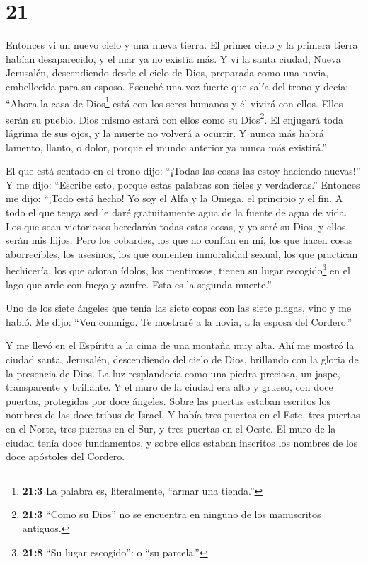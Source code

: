 \hypertarget{section-20}{%
\section{21}\label{section-20}}

 Entonces vi un nuevo cielo y una nueva tierra. El primer
cielo y la primera tierra habían desaparecido, y el mar ya no existía
más.  Y vi la santa ciudad, Nueva Jerusalén, descendiendo
desde el cielo de Dios, preparada como una novia, embellecida para su
esposo.  Escuché una voz fuerte que salía del trono y decía:
``Ahora la casa de Dios\footnote{\textbf{21:3} La palabra es,
  literalmente, ``armar una tienda.''} está con los seres humanos y él
vivirá con ellos. Ellos serán su pueblo. Dios mismo estará con ellos
como su Dios\footnote{\textbf{21:3} ``Como su Dios'' no se encuentra en
  ninguno de los manuscritos antiguos.}.  El enjugará toda
lágrima de sus ojos, y la muerte no volverá a ocurrir. Y nunca más habrá
lamento, llanto, o dolor, porque el mundo anterior ya nunca más
existirá.''

 El que está sentado en el trono dijo: ``¡Todas las cosas
las estoy haciendo nuevas!'' Y me dijo: ``Escribe esto, porque estas
palabras son fieles y verdaderas.''  Entonces me dijo:
``¡Todo está hecho! Yo soy el Alfa y la Omega, el principio y el fin. A
todo el que tenga sed le daré gratuitamente agua de la fuente de agua de
vida.  Los que sean victoriosos heredarán todas estas cosas,
y yo seré su Dios, y ellos serán mis hijos.  Pero los
cobardes, los que no confían en mí, los que hacen cosas aborrecibles,
los asesinos, los que comenten inmoralidad sexual, los que practican
hechicería, los que adoran ídolos, los mentirosos, tienen su lugar
escogido\footnote{\textbf{21:8} ``Su lugar escogido'': o ``su parcela.''}
en el lago que arde con fuego y azufre. Esta es la segunda muerte.''

 Uno de los siete ángeles que tenía las siete copas con las
siete plagas, vino y me habló. Me dijo: ``Ven conmigo. Te mostraré a la
novia, a la esposa del Cordero.''

 Y me llevó en el Espíritu a la cima de una montaña muy
alta. Ahí me mostró la ciudad santa, Jerusalén, descendiendo del cielo
de Dios,  brillando con la gloria de la presencia de Dios.
La luz resplandecía como una piedra preciosa, un jaspe, transparente y
brillante.  Y el muro de la ciudad era alto y grueso, con
doce puertas, protegidas por doce ángeles. Sobre las puertas estaban
escritos los nombres de las doce tribus de Israel.  Y había
tres puertas en el Este, tres puertas en el Norte, tres puertas en el
Sur, y tres puertas en el Oeste.  El muro de la ciudad
tenía doce fundamentos, y sobre ellos estaban inscritos los nombres de
los doce apóstoles del Cordero.


